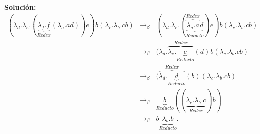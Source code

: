 \begin{enumerate}[a)]
    \textbf{Solución:}
    \begin{eqnarray*}
        (\lambda_d .\lambda_e .(\underbrace{\lambda_f .f}_{Redex}
        (\lambda_a .ad))e)b(\lambda_c .\lambda_b .cb)
        &\rightarrow_\beta&
        (\lambda_d .\lambda_e
        .(\underbrace{\overbrace{\lambda_a .a}^{Redex}d}_{Reducto})e)
        b(\lambda_c .\lambda_b .cb)\\
        &\rightarrow_\beta& (\lambda_d .\overbrace{\lambda_e .\underbrace{e}_{Reducto}}^{Redex}
        (d) b(\lambda_c .\lambda_b .cb)\\
        &\rightarrow_\beta& (\overbrace{\lambda_d .\underbrace{d}_{Reducto}}^{Redex}
        (b)(\lambda_c .\lambda_b .cb)\\
        &\rightarrow_\beta& \underbrace{b}_{Reducto}
        ((\underbrace{\lambda_c .\lambda_b .c}_{Redex})b)\\
        &\rightarrow_\beta& b \underbrace{\lambda_b . b}_{Reducto}.
    \end{eqnarray*}
\end{enumerate}
